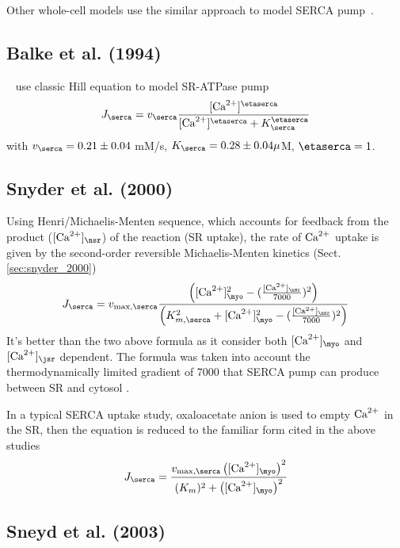 Other whole-cell models use the similar approach to model SERCA
pump~\citep{klein1991,sipido1991,
  balke1994,wier1994lce,luo1994dmc_a,luo1994dmc_b}.




\subsection{Balke et al. (1994)}
\label{sec:balke-et-al}

~\citep{balke1994} use classic Hill equation to model SR-ATPase pump
\begin{equation}
  \label{eq:1434}
  J_\serca = v_\serca \frac{[\Ca]^\etaserca}{[\Ca]^\etaserca+K_\serca^\etaserca}
\end{equation}
with $v_\serca = 0.21\pm0.04$ mM/s, $K_\serca=0.28\pm 0.04\mu$M,
$\etaserca=1$. 

\subsection{Snyder et al. (2000)}

Using Henri/Michaelis-Menten sequence, which accounts for feedback from the
product ($[\Ca]_\nsr$) of the reaction (SR uptake), the rate of ${\text{Ca}^{2+}}$ uptake is
given by the second-order reversible Michaelis-Menten kinetics
(Sect.\ref{sec:snyder_2000})
\begin{equation}
J_\serca = v_{\max, \serca} \frac{\left([\Ca]_\myo^2 -
(\frac{[\Ca]_\nsr}{7000})^2\right)}{\left(K_{m,\serca}^2 + [\Ca]_\myo^2 -
(\frac{[\Ca]_\nsr}{7000})^2\right)}
\end{equation}
It's better than the two above formula as it consider both $[\Ca]_\myo$ and
$[\Ca]_\jsr$ dependent. The formula was taken into account the thermodynamically
limited gradient of 7000 that SERCA pump can produce between SR and cytosol
\citep{shannon1997}.  

In a typical SERCA uptake study, oxaloacetate anion is used to empty ${\text{Ca}^{2+}}$ in
the SR, then the equation is reduced to the familiar form cited in the above studies
\begin{equation}
J_\serca = \frac{v_{\max,\serca}\left( [\Ca]_\myo \right)^2}{(K_m)^2 + \left(
[\Ca]_\myo \right)^2}
\end{equation}

\subsection{Sneyd et al. (2003)}
\label{sec:serca_sneyd2003}

